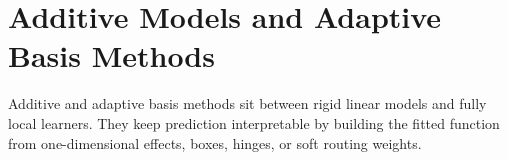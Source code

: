 \section{Additive Models and Adaptive Basis Methods}

Additive and adaptive basis methods sit between rigid linear models and fully local learners.  They keep prediction interpretable by building the fitted function from one-dimensional effects, boxes, hinges, or soft routing weights.



